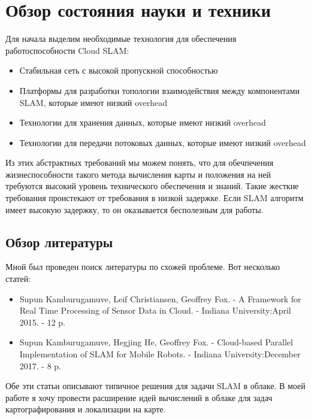 \documentclass[a4paper, 14pt]{extreport}
\begin{document}
\chapter{Обзор состояния науки и техники}
\par Для начала выделим необходимые технология для обеспечения работоспособности Cloud SLAM:
\begin{itemize}
        \item Стабильная сеть с высокой пропускной способностью
        \item Платформы для разработки топологии взаимодействия между компонентами SLAM, которые имеют низкий overhead
        \item Технологии для хранения данных, которые имеют низкий overhead
        \item Технологии для передачи потоковых данных, которые имеют низкий overhead
\end{itemize}
\par Из этих абстрактных требований мы можем понять, что для обечпечения жизнеспособности такого метода вычисления карты и положения на ней требуются высокий уровень технического обеспечения и знаний. Такие жесткие требования проистекают от требования в низкой задержке. Если SLAM алгоритм имеет высокую задержку, то он оказывается бесполезным для работы.
\section{Обзор литературы}
\par Мной был проведен поиск литературы по схожей проблеме. Вот несколько статей:
\begin{itemize}
        \item Supun Kamburugamuve, Leif Christiansen, Geoffrey Fox. - A Framework for Real Time Processing of Sensor Data in Cloud. - Indiana University:April 2015. - 12 p.
        \item Supun Kamburugamuve, Hegjing He, Geoffrey Fox. - Cloud-based Parallel Implementation of SLAM for Mobile Robots. - Indiana University:December 2017. - 8 p.
\end{itemize}
\par Обе эти статьи описывают типичное решения для задачи SLAM в облаке. В моей работе я хочу провести расширение идей вычислений в облаке для задач картографирования и локализации на карте.
\end{document}
